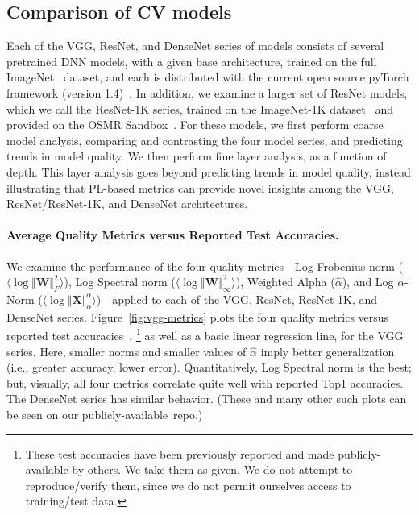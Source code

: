 \subsection{Comparison of CV models}
\label{sxn:cv}

Each of the VGG, ResNet, and DenseNet series of models consists of several pretrained DNN models, with a given base architecture, trained on the full ImageNet~\cite{imagenet} dataset, and each is distributed with the current open source pyTorch framework (version 1.4)~\cite{pytorch}.
In addition, we examine a larger set of ResNet models, which we call the ResNet-1K series, trained on the ImageNet-1K dataset~\cite{imagenet} and provided on the OSMR Sandbox~\cite{osmr}.
For these models, we first perform coarse model analysis, comparing and contrasting the four model series, and predicting trends in model quality.
We then perform fine layer analysis, as a function of depth.
This layer analysis goes beyond predicting trends in model quality, instead illustrating that PL-based metrics can provide novel insights among the VGG, ResNet/ResNet-1K, and DenseNet architectures. 


\paragraph{Average Quality Metrics versus Reported Test Accuracies.}

We examine the performance of the four quality metrics---Log Frobenius norm
                                                         ($\langle\log\Vert\mathbf{W}\Vert^{2}_{F}\rangle$), 
                                                         Log Spectral norm
                                                         ($\langle\log\Vert\mathbf{W}\Vert^{2}_{\infty}\rangle$),
                                                         Weighted Alpha
                                                         ($\hat{\alpha}$),
                                                         and Log $\alpha$-Norm
                                                         ($\langle\log\Vert\mathbf{X}\Vert^{\alpha}_{\alpha}\rangle$)---applied to each of the VGG, ResNet, ResNet-1K, and DenseNet series.
%
Figure~\ref{fig:vgg-metrics} plots the four quality metrics versus reported test accuracies~\cite{pytorch},%
\footnote{These test accuracies have been previously reported and made publicly-available by others.  We take them as given.  We do not attempt to reproduce/verify them, since we do not permit ourselves access to training/test data.}
as well as a basic linear regression line, for the VGG series.
Here, smaller norms and smaller values of $\hat{\alpha}$ imply better generalization (i.e., greater accuracy, lower error). 
Quantitatively, Log Spectral norm is the best; but, visually, all four metrics correlate quite well with reported Top1 accuracies.
The DenseNet series has similar behavior.
(These and many other such plots can be seen on our publicly-available~repo.)

